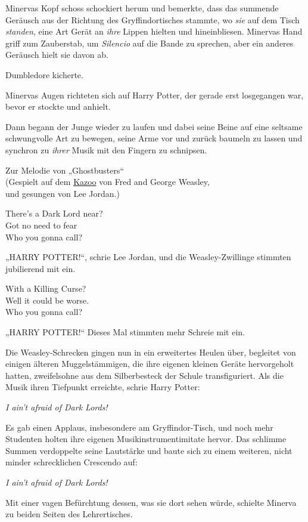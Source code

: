 {Minervas Kopf schoss schockiert herum und bemerkte, dass das summende Geräusch aus der Richtung des Gryffindortisches stammte, wo \emph{sie} auf dem Tisch \emph{standen}, eine Art Gerät an \emph{ihre} Lippen hielten und hineinbliesen. Minervas Hand griff zum Zauberstab, um \emph{Silencio} auf die Bande zu sprechen, aber ein anderes Geräusch hielt sie davon ab.

Dumbledore kicherte.

Minervas Augen richteten sich auf Harry Potter, der gerade erst losgegangen war, bevor er stockte und anhielt.

Dann begann der Junge wieder zu laufen und dabei seine Beine auf eine seltsame schwungvolle Art zu bewegen, seine Arme vor und zurück baumeln zu lassen und synchron zu \emph{ihrer} Musik mit den Fingern zu schnipsen.

Zur Melodie von „Ghostbusters“\\ (Gespielt auf dem \href{http://de.wikipedia.org/wiki/Kazoo}{Kazoo} von Fred and George Weasley,\\ und gesungen von Lee Jordan.)

There's a Dark Lord near?\\ Got no need to fear\\ Who you gonna call?

„HARRY POTTER!“, schrie Lee Jordan, und die Weasley-Zwillinge stimmten jubilierend mit ein.

With a Killing Curse?\\ Well it could be worse.\\ Who you gonna call?

„HARRY POTTER!“ Dieses Mal stimmten mehr Schreie mit ein.

Die Weasley-Schrecken gingen nun in ein erweitertes Heulen über, begleitet von einigen älteren Muggelstämmigen, die ihre eigenen kleinen Geräte hervorgeholt hatten, zweifelsohne aus dem Silberbesteck der Schule transfiguriert. Als die Musik ihren Tiefpunkt erreichte, schrie Harry Potter:

\emph{I ain't afraid of Dark Lords!}

Es gab einen Applaus, insbesondere am Gryffindor-Tisch, und noch mehr Studenten holten ihre eigenen Musikinstrumentimitate hervor. Das schlimme Summen verdoppelte seine Lautstärke und baute sich zu einem weiteren, nicht minder schrecklichen Crescendo auf:

\emph{I ain't afraid of Dark Lords!}

Mit einer vagen Befürchtung dessen, was sie dort sehen würde, schielte Minerva zu beiden Seiten des Lehrertisches.

}
